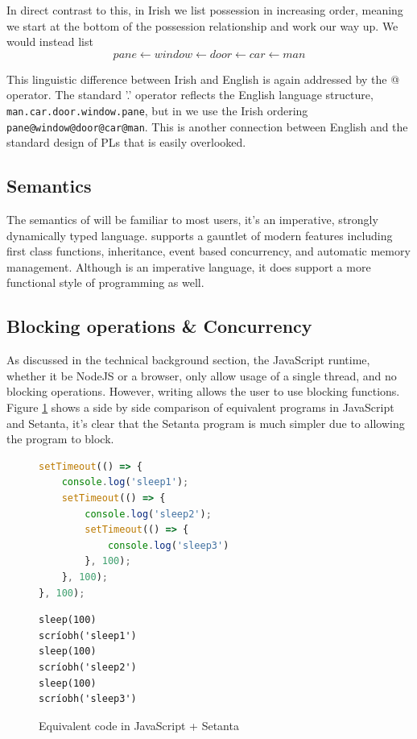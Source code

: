 In direct contrast to this, in Irish we list possession in increasing order, meaning we start at the bottom of the possession relationship and work our way up. We would instead list
\[pane \leftarrow window \leftarrow door \leftarrow car \leftarrow man\]

This linguistic difference between Irish and English is again addressed by the @ operator. The standard '.' operator reflects the English language structure, \verb|man.car.door.window.pane|, but in \Setanta{} we use the Irish ordering \verb|pane@window@door@car@man|. This is another connection between English and the standard design of PLs that is easily overlooked.

\subsection{Semantics}

The semantics of \Setanta{} will be familiar to most users, it's an imperative, strongly dynamically typed language. \Setanta{} supports a gauntlet of modern features including first class functions, inheritance, event based concurrency, and automatic memory management. Although \Setanta{} is an imperative language, it does support a more functional style of programming as well.

\subsection{Blocking operations \& Concurrency}

As discussed in the technical background section, the JavaScript runtime, whether it be NodeJS or a browser, only allow usage of a single thread, and no blocking operations. However, writing \Setanta{} allows the user to use blocking functions. Figure \ref{blockingcomparison} shows a side by side comparison of equivalent programs in JavaScript and Setanta, it's clear that the Setanta program is much simpler due to allowing the program to block.

\begin{figure}[ht]
    \begin{minipage}[t]{0.45\textwidth}
        \begin{lstlisting}[language=javascript, caption=JavaScript]
setTimeout(() => {
    console.log('sleep1');
    setTimeout(() => {
        console.log('sleep2');
        setTimeout(() => {
            console.log('sleep3')
        }, 100);
    }, 100);
}, 100);
        \end{lstlisting}
    \end{minipage}\qquad
    \begin{minipage}[t]{0.45\textwidth}
        \begin{lstlisting}[language=setanta, caption=Setanta]
sleep(100)
scríobh('sleep1')
sleep(100)
scríobh('sleep2')
sleep(100)
scríobh('sleep3')
        \end{lstlisting}
    \end{minipage}
    \caption{Equivalent code in JavaScript + Setanta}
    \label{blockingcomparison}
\end{figure}


